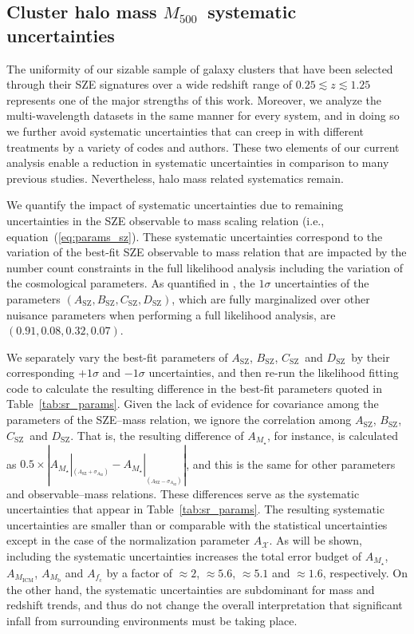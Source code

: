 \documentclass[useAMS,usenatbib,iop,numberedappendix]{mn2e}
\newcommand{\Mfiveoo}{\ensuremath{M_{500}}}
\newcommand{\redshift}{\ensuremath{z}}
\newcommand{\Mstar}{\ensuremath{M_{\star}}}
\newcommand{\Mgas}{\ensuremath{M_{\mathrm{ICM}}}}
\newcommand{\Mbary}{\ensuremath{M_{\mathrm{b}}}}
\newcommand{\Asz}{\ensuremath{A_{\mathrm{SZ}}}}
\newcommand{\Bsz}{\ensuremath{B_{\mathrm{SZ}}}}
\newcommand{\Csz}{\ensuremath{C_{\mathrm{SZ}}}}
\newcommand{\Dsz}{\ensuremath{D_{\mathrm{SZ}}}}
\newcommand{\fcold}{\ensuremath{f_{\mathrm{c}}}}
\begin{document}
\subsection{Cluster halo mass \Mfiveoo\ systematic uncertainties}
\label{sec:sys_mass}

The uniformity of our sizable sample of galaxy clusters that have been selected through their SZE signatures over a wide redshift range of $0.25\lesssim\redshift\lesssim1.25$ represents one of the major strengths of this work.  Moreover, we analyze the multi-wavelength datasets in the same manner for every system, and in doing so we further avoid systematic uncertainties that can creep in with different treatments by a variety of codes and authors.
These two elements of our current analysis enable a reduction in systematic uncertainties in comparison to many previous studies. 
Nevertheless, halo mass related systematics remain.




We quantify the impact of systematic uncertainties due to remaining uncertainties in the SZE observable to mass scaling relation (i.e., equation~(\ref{eq:params_sz}).  These systematic uncertainties correspond to the variation of the best-fit SZE observable to mass relation that are impacted by the number count constraints in the full likelihood analysis including the variation of the cosmological parameters.
As quantified in \cite{dehaan16},
the $1\sigma$ uncertainties of the parameters $\left(\Asz,\Bsz,\Csz,\Dsz\right)$, which are fully marginalized over other nuisance parameters when performing a full likelihood analysis, 
are $\left(0.91, 0.08, 0.32, 0.07\right)$.

We separately vary the best-fit parameters of  \Asz, \Bsz, \Csz\ and \Dsz\ by their corresponding $+1\sigma$ and $-1\sigma$ uncertainties, and then re-run the likelihood fitting code to calculate the resulting difference in the best-fit parameters quoted in Table~\ref{tab:sr_params}.  Given the lack of evidence for covariance among the parameters of the SZE--mass relation, we ignore the correlation among \Asz, \Bsz, \Csz\ and \Dsz. That is, the resulting difference of $A_{\Mstar}$, for instance, is calculated as $0.5 \times \left| A_{\Mstar}|_{_{(\Asz+\sigma_{\Asz})}} - A_{\Mstar}|_{_{(\Asz-\sigma_{\Asz})}} \right|$, and this is the same for other parameters and observable--mass relations.  These differences serve as the systematic uncertainties that appear in Table~\ref{tab:sr_params}.  The resulting systematic uncertainties are smaller than or comparable with the statistical uncertainties except in the case of the normalization parameter $A_{\mathcal{X}}$.  As will be shown, including the systematic uncertainties increases the total error budget of $A_{\Mstar}$, $A_{\Mgas}$, $A_{\Mbary}$ and $A_{\fcold}$ by a factor of $\approx2$, $\approx5.6$, $\approx5.1$ and $\approx1.6$, respectively.   On the other hand, the systematic uncertainties are subdominant for mass and redshift trends, and thus do not change the overall interpretation that significant infall from surrounding environments must be taking place.
\end{document}
